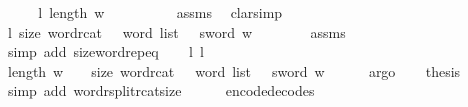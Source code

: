 \begin{isabellebody}
%
\isadelimproof
%
\endisadelimproof
%
\isatagproof
{}\isamarkupfalse%
\ {\isacharminus}{\kern0pt}\isanewline
\ \ \isamarkupfalse%
\ l{}{\isacharcolon}{\kern0pt}\ {\isachardoublequoteopen}length\ w\ {\isacharasterisk}{\kern0pt}\ {}\ {\isacharequal}{\kern0pt}\ {}{}{\isachardoublequoteclose}\isanewline
\ \ \ \ \isamarkupfalse%
\ assms\ \isamarkupfalse%
\ clarsimp\isanewline
\ \ \isamarkupfalse%
\ \isamarkupfalse%
\ l{}{\isacharcolon}{\kern0pt}\ {\isachardoublequoteopen}size\ {\isacharparenleft}{\kern0pt}{\isacharparenleft}{\kern0pt}word{\isacharunderscore}{\kern0pt}rcat\ {\isacharcolon}{\kern0pt}{\isacharcolon}{\kern0pt}\ {}\ word\ list\ {\isasymRightarrow}\ {}{}\ sword{\isacharparenright}{\kern0pt}\ w{\isacharparenright}{\kern0pt}\ {\isacharequal}{\kern0pt}\ {}{}{\isachardoublequoteclose}\isanewline
\ \ \ \ \isamarkupfalse%
\ assms\isanewline
\ \ \ \ \isamarkupfalse%
\ {\isacharparenleft}{\kern0pt}simp\ add{\isacharcolon}{\kern0pt}\ size{\isacharunderscore}{\kern0pt}word{\isachardot}{\kern0pt}rep{\isacharunderscore}{\kern0pt}eq{\isacharparenright}{\kern0pt}\isanewline
\ \ \isamarkupfalse%
\ l{}\ l{}\ \isamarkupfalse%
\ {\isachardoublequoteopen}length\ w\ {\isacharasterisk}{\kern0pt}\ {}\ {\isacharequal}{\kern0pt}\ size\ {\isacharparenleft}{\kern0pt}{\isacharparenleft}{\kern0pt}word{\isacharunderscore}{\kern0pt}rcat\ {\isacharcolon}{\kern0pt}{\isacharcolon}{\kern0pt}\ {}\ word\ list\ {\isasymRightarrow}\ {}{}\ sword{\isacharparenright}{\kern0pt}\ w{\isacharparenright}{\kern0pt}{\isachardoublequoteclose}\isanewline
\ \ \ \ \isamarkupfalse%
\ argo\isanewline
\ \ \isamarkupfalse%
\ {\isacharquery}{\kern0pt}thesis\isanewline
\ \ \ \ \isamarkupfalse%
\ {\isacharparenleft}{\kern0pt}simp\ add{\isacharcolon}{\kern0pt}\ word{\isacharunderscore}{\kern0pt}rsplit{\isacharunderscore}{\kern0pt}rcat{\isacharunderscore}{\kern0pt}size{\isacharparenright}{\kern0pt}\isanewline
{}\isamarkupfalse%
%
\endisatagproof
{\isafoldproof}%
%
\isadelimproof
\isanewline
%
\endisadelimproof
\ \ \ \ \isanewline
\isanewline
{}\isamarkupfalse%
\ encode{\isacharunderscore}{\kern0pt}decode{\isacharunderscore}{\kern0pt}s{}{}{\isacharcolon}{\kern0pt}\isanewline

\end{isabellebody}
